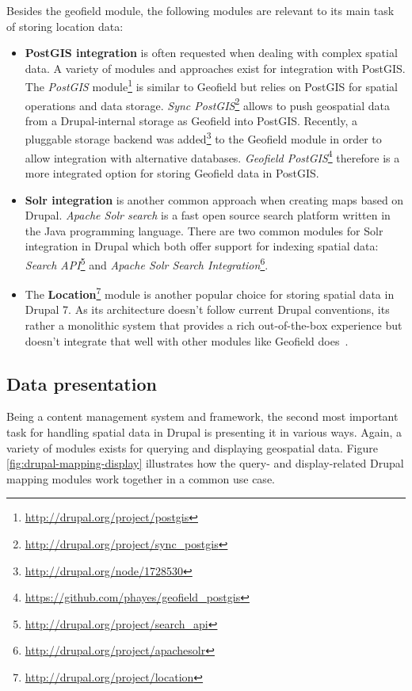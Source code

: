Besides the geofield module, the following modules are relevant to its main task of storing location data: 

\begin{itemize}

\item \textbf{PostGIS integration} is often requested when dealing with complex spatial data. A variety of modules and approaches exist for integration with PostGIS. The \textit{PostGIS} module\footnote{\url{http://drupal.org/project/postgis}} is similar to Geofield but relies on PostGIS for spatial operations and data storage. \textit{Sync PostGIS}\footnote{\url{http://drupal.org/project/sync_postgis}} allows to push geospatial data from a Drupal-internal storage as Geofield into PostGIS. Recently, a pluggable storage backend was added\footnote{\url{http://drupal.org/node/1728530}} to the Geofield module in order to allow integration with alternative databases. \textit{Geofield PostGIS}\footnote{\url{https://github.com/phayes/geofield_postgis}} therefore is a more integrated option for storing Geofield data in PostGIS.

\item \textbf{Solr integration} is another common approach when creating maps based on Drupal. \textit{Apache Solr search} is a fast open source search platform written in the Java programming language. There are two common modules for Solr integration in Drupal which both offer support for indexing spatial data: \textit{Search API}\footnote{\url{http://drupal.org/project/search_api}} and \textit{Apache Solr Search Integration}\footnote{\url{http://drupal.org/project/apachesolr}}.

\item The \textbf{Location}\footnote{\url{http://drupal.org/project/location}} module is another popular choice for storing spatial data in Drupal 7. As its architecture doesn't follow current Drupal conventions, its rather a monolithic system that provides a rich out-of-the-box experience but doesn't integrate that well with other modules like Geofield does~\cite{Zzolo11mappingdrupal}.

\end{itemize}

\subsection{Data presentation}

Being a content management system and framework, the second most important task for handling spatial data in Drupal is presenting it in various ways. Again, a variety of modules exists for querying and displaying geospatial data. Figure \ref{fig:drupal-mapping-display} illustrates how the query- and display-related Drupal mapping modules work together in a common use case.

